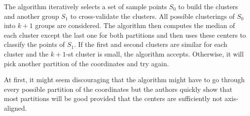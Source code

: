 \documentclass[11pt,letter]{article}
\begin{document}
The algorithm iteratively selects a set of sample points $S_0$ to build the clusters and another group $S_1$ to cross-validate the clusters. All possible clusterings of $S_0$ into $k+1$ groups are considered. The algorithm then computes the median of each cluster except the last one for both partitions and then uses these centers to classify the points of $S_1$. If the first and second clusters are similar for each cluster and the $k+1$-st cluster is small, the algorithm accepts. Otherwise, it will pick another partition of the coordinates and try again.  

At first, it might seem discouraging that the algorithm might have to go through every possible partition of the coordinates but the authors quickly show that most partitions will be good provided that the centers are sufficiently not axis-aligned. 





 
 
\end{document}
